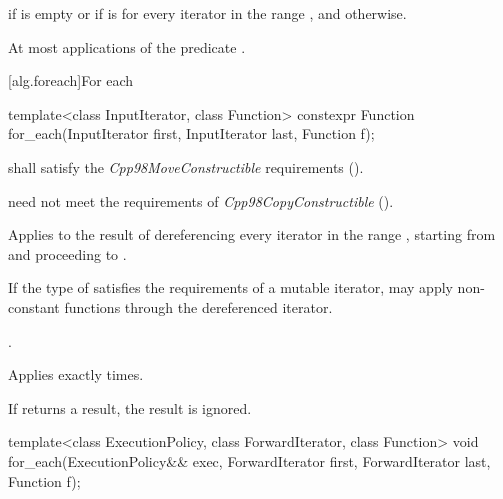 \begin{itemdescr}
\pnum
\returns {} if
 is empty or if
 is  for every
iterator  in the range , and 
otherwise.

\pnum
\complexity At most  applications of the predicate
.
\end{itemdescr}

[alg.foreach]{For each}

%
\begin{itemdecl}
template<class InputIterator, class Function>
  constexpr Function for_each(InputIterator first, InputIterator last, Function f);
\end{itemdecl}

\begin{itemdescr}
\pnum
\requires {} shall satisfy the
\textit{Cpp98MoveConstructible} requirements ().
\begin{note}  need not meet the requirements of
\textit{Cpp98CopyConstructible} (). \end{note}

\pnum
\effects
Applies
 to the result of dereferencing every iterator in the range
,
starting from
and proceeding to
.
\begin{note} If the type of  satisfies the
requirements of a mutable iterator,  may apply non-constant
functions through the dereferenced iterator.\end{note}

\pnum
\returns
{}.

\pnum
\complexity
Applies 
exactly
times.

\pnum
\remarks
If  returns a result, the result is ignored.
\end{itemdescr}

%
\begin{itemdecl}
template<class ExecutionPolicy, class ForwardIterator, class Function>
  void for_each(ExecutionPolicy&& exec,
                ForwardIterator first, ForwardIterator last,
                Function f);
\end{itemdecl}

